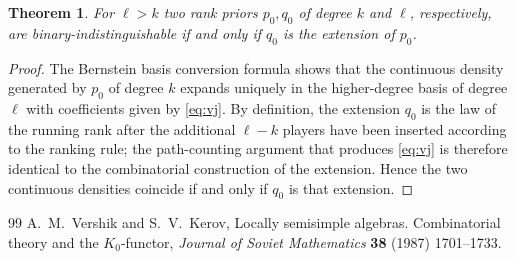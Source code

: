 \documentclass[10pt,a4paper]{amsart}
\newtheorem{theorem}{Theorem}[section]
\numberwithin{equation}{section}
\begin{document}
\begin{theorem}
For \(\ell>k\) two rank priors \(p_0,q_0\) of degree \(k\) and \(\ell\), respectively, are binary-indistinguishable if and only if \(q_0\) is the extension of \(p_0\).
\end{theorem}

\begin{proof}
The Bernstein basis conversion formula shows that the continuous density generated by \(p_0\) of degree \(k\) expands uniquely in the higher-degree basis of degree \(\ell\) with coefficients given by \eqref{eq:vj}. By definition, the extension \(q_0\) is the law of the running rank after the additional \(\ell-k\) players have been inserted according to the ranking rule; the path-counting argument that produces \eqref{eq:vj} is therefore identical to the combinatorial construction of the extension. Hence the two continuous densities coincide if and only if \(q_0\) is that extension.
\end{proof}


\begin{thebibliography}{99}
 A.~M.~Vershik and S.~V.~Kerov, Locally semisimple algebras. Combinatorial theory and the \(K_0\)-functor, \textit{Journal of Soviet Mathematics} \textbf{38} (1987) 1701--1733.
\end{thebibliography}
\end{document}
